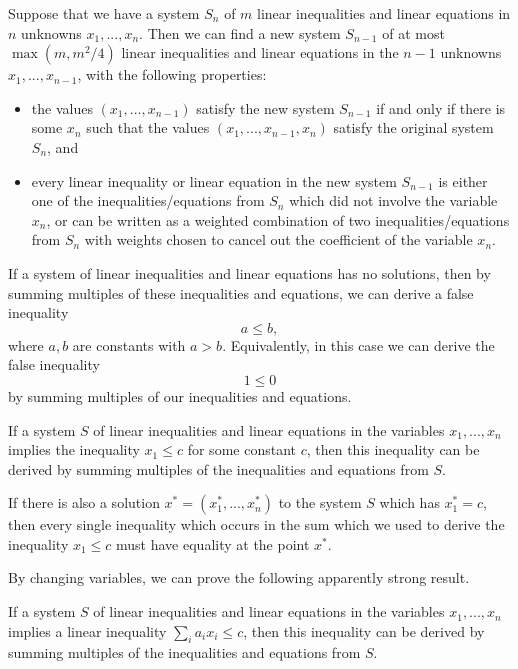 \begin{thm} Suppose that we have a system $S_n$ of $m$ linear inequalities and linear equations in $n$ unknowns $x_1, ..., x_n$. Then we can find a new system $S_{n-1}$ of at most $\max(m, m^2/4)$ linear inequalities and linear equations in the $n-1$ unknowns $x_1, ..., x_{n-1}$, with the following properties:
\begin{itemize}
\item the values $(x_1, ..., x_{n-1})$ satisfy the new system $S_{n-1}$ if and only if there is some $x_n$ such that the values $(x_1, ..., x_{n-1}, x_n)$ satisfy the original system $S_n$, and

\item every linear inequality or linear equation in the new system $S_{n-1}$ is either one of the inequalities/equations from $S_n$ which did not involve the variable $x_n$, or can be written as a weighted combination of two inequalities/equations from $S_n$ with weights chosen to cancel out the coefficient of the variable $x_n$.
\end{itemize}
\end{thm}

\begin{cor} If a system of linear inequalities and linear equations has no solutions, then by summing multiples of these inequalities and equations, we can derive a false inequality
\[
a \le b,
\]
where $a,b$ are constants with $a > b$. Equivalently, in this case we can derive the false inequality
\[
1 \le 0
\]
by summing multiples of our inequalities and equations.
\end{cor}

\begin{cor} If a system $S$ of linear inequalities and linear equations in the variables $x_1, ..., x_n$ implies the inequality $x_1 \le c$ for some constant $c$, then this inequality can be derived by summing multiples of the inequalities and equations from $S$.

If there is also a solution $x^* = (x_1^*, ..., x_n^*)$ to the system $S$ which has $x_1^* = c$, then every single inequality which occurs in the sum which we used to derive the inequality $x_1 \le c$ must have equality at the point $x^*$.
\end{cor}

By changing variables, we can prove the following apparently strong result.

\begin{cor} If a system $S$ of linear inequalities and linear equations in the variables $x_1, ..., x_n$ implies a linear inequality $\sum_i a_i x_i \le c$, then this inequality can be derived by summing multiples of the inequalities and equations from $S$.
\end{cor}

